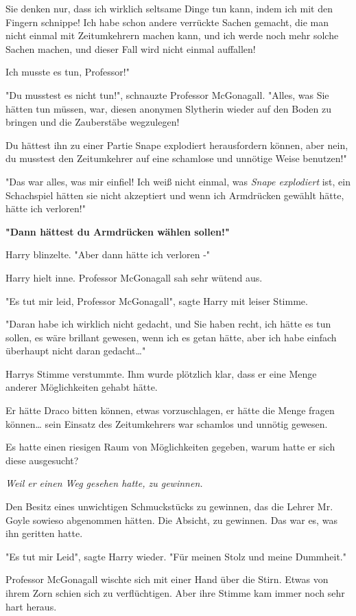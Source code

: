 {Sie denken nur, dass ich wirklich seltsame Dinge tun kann, indem ich mit den Fingern schnippe! Ich habe schon andere verrückte Sachen gemacht, die man nicht einmal mit Zeitumkehrern machen kann, und ich werde noch mehr solche Sachen machen, und dieser Fall wird nicht einmal auffallen!

Ich musste es tun, Professor!"

"Du musstest es nicht tun!", schnauzte Professor McGonagall. "Alles, was Sie hätten tun müssen, war, diesen anonymen Slytherin wieder auf den Boden zu bringen und die Zauberstäbe wegzulegen!

Du hättest ihn zu einer Partie Snape explodiert herausfordern können, aber nein, du musstest den Zeitumkehrer auf eine schamlose und unnötige Weise benutzen!"

"Das war alles, was mir einfiel! Ich weiß nicht einmal, was \emph{Snape explodiert} ist, ein Schachspiel hätten sie nicht akzeptiert und wenn ich Armdrücken gewählt hätte, hätte ich verloren!"

\textbf{"Dann hättest du Armdrücken wählen sollen!"}

Harry blinzelte. "Aber dann hätte ich verloren -"

Harry hielt inne. Professor McGonagall sah sehr wütend aus.

"Es tut mir leid, Professor McGonagall", sagte Harry mit leiser Stimme.

"Daran habe ich wirklich nicht gedacht, und Sie haben recht, ich hätte es tun sollen, es wäre brillant gewesen, wenn ich es getan hätte, aber ich habe einfach überhaupt nicht daran gedacht…"

Harrys Stimme verstummte. Ihm wurde plötzlich klar, dass er eine Menge anderer Möglichkeiten gehabt hätte.

Er hätte Draco bitten können, etwas vorzuschlagen, er hätte die Menge fragen können… sein Einsatz des Zeitumkehrers war schamlos und unnötig gewesen.

Es hatte einen riesigen Raum von Möglichkeiten gegeben, warum hatte er sich diese ausgesucht?

\emph{Weil er einen Weg gesehen hatte, zu gewinnen.}

Den Besitz eines unwichtigen Schmuckstücks zu gewinnen, das die Lehrer Mr. Goyle sowieso abgenommen hätten. Die Absicht, zu gewinnen. Das war es, was ihn geritten hatte.

"Es tut mir Leid", sagte Harry wieder. "Für meinen Stolz und meine Dummheit."

Professor McGonagall wischte sich mit einer Hand über die Stirn. Etwas von ihrem Zorn schien sich zu verflüchtigen. Aber ihre Stimme kam immer noch sehr hart heraus.

}
